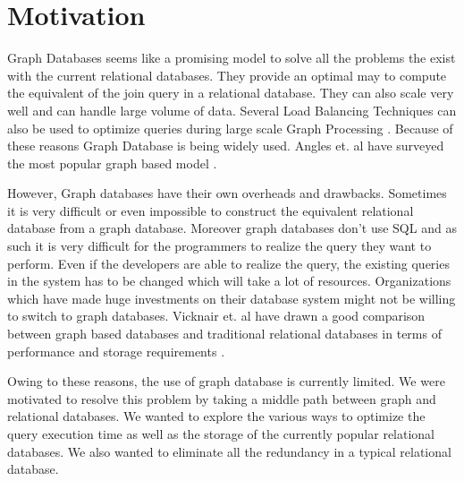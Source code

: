 \documentclass[12pt, oneside]{book}
\begin{document}
\section{Motivation}
Graph Databases seems like a promising model to solve all the problems the exist with the current relational databases. They provide an optimal may to compute the equivalent of the join query in a relational database. They can also scale very well and can handle large volume of data. Several Load Balancing Techniques can also be used to optimize queries during large scale Graph Processing \cite{load_balancing}. Because of these reasons Graph Database is being widely used. Angles et. al have surveyed the most popular graph based model \cite{graph_database_survey}. \\ \par
However, Graph databases have their own overheads and drawbacks. Sometimes it is very difficult or even impossible to construct the equivalent relational database from a graph database. Moreover graph databases don't use SQL and as such it is very difficult for the programmers to realize the query they want to perform. Even if the developers are able to realize the query, the existing queries in the system has to be changed which will take a lot of resources. Organizations which have made huge investments on their database system might not be willing to switch to graph databases. Vicknair et. al have drawn a good comparison between graph based databases and traditional relational databases in terms of performance and storage requirements \cite{graph_relational_comparison}. \\ \par
Owing to these reasons, the use of graph database is currently limited. We were motivated to resolve this problem by taking a middle path between graph and relational databases. We wanted to explore the various ways to optimize the query execution time as well as the storage of the currently popular relational databases. We also wanted to eliminate all the redundancy in a typical relational database.
\end{document}
